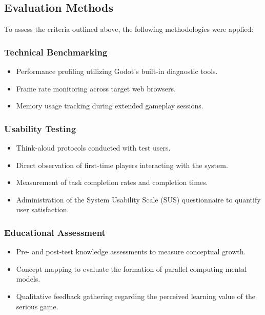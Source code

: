 \subsection{Evaluation Methods}
\label{subsec:evaluation-methods}

To assess the criteria outlined above, the following methodologies were applied:

\subsubsection*{Technical Benchmarking}
\begin{itemize}
    \item Performance profiling utilizing Godot's built-in diagnostic tools.
    \item Frame rate monitoring across target web browsers.
    \item Memory usage tracking during extended gameplay sessions.
\end{itemize}

\subsubsection*{Usability Testing}
\begin{itemize}
    \item Think-aloud protocols conducted with test users.
    \item Direct observation of first-time players interacting with the system.
    \item Measurement of task completion rates and completion times.
    \item Administration of the System Usability Scale (SUS) questionnaire to quantify user satisfaction. %
\end{itemize}

\subsubsection*{Educational Assessment}
\begin{itemize}
    \item Pre- and post-test knowledge assessments to measure conceptual growth. %
    \item Concept mapping to evaluate the formation of parallel computing mental models.
    \item Qualitative feedback gathering regarding the perceived learning value of the serious game.
\end{itemize}

